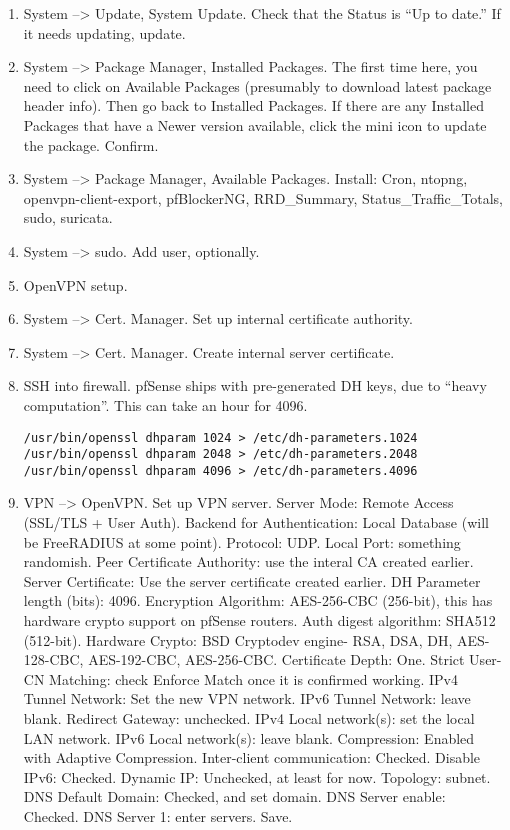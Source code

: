 \begin{enumerate}
 \item System --> Update, System Update. Check that the Status is ``Up to date.'' If it needs updating, update.
 \item System --> Package Manager, Installed Packages. The first time here, you need to click on Available Packages (presumably to download latest package header info). Then go back to Installed Packages. If there are any Installed Packages that have a Newer version available, click the mini icon to update the package. Confirm.
 \item System --> Package Manager, Available Packages. Install: Cron, ntopng, openvpn-client-export, pfBlockerNG, RRD\_Summary, Status\_Traffic\_Totals, sudo, suricata.
 \item System --> sudo. Add user, optionally.


 \item OpenVPN setup.
 \item System --> Cert. Manager. Set up internal certificate authority.
 \item System --> Cert. Manager. Create internal server certificate.
 \item SSH into firewall. pfSense ships with pre-generated DH keys, due to ``heavy computation''. This can take an hour for 4096.
\begin{verbatim}
/usr/bin/openssl dhparam 1024 > /etc/dh-parameters.1024
/usr/bin/openssl dhparam 2048 > /etc/dh-parameters.2048
/usr/bin/openssl dhparam 4096 > /etc/dh-parameters.4096
\end{verbatim}
 \item VPN --> OpenVPN. Set up VPN server. Server Mode: Remote Access (SSL/TLS + User Auth). Backend for Authentication: Local Database (will be FreeRADIUS at some point). Protocol: UDP. Local Port: something randomish. Peer Certificate Authority: use the interal CA created earlier. Server Certificate: Use the server certificate created earlier. DH Parameter length (bits): 4096. Encryption Algorithm: AES-256-CBC (256-bit), this has hardware crypto support on pfSense routers. Auth digest algorithm: SHA512 (512-bit). Hardware Crypto: BSD Cryptodev engine- RSA, DSA, DH, AES-128-CBC, AES-192-CBC, AES-256-CBC. Certificate Depth: One. Strict User-CN Matching: check Enforce Match once it is confirmed working. IPv4 Tunnel Network: Set the new VPN network. IPv6 Tunnel Network: leave blank. Redirect Gateway: unchecked.  IPv4 Local network(s): set the local LAN network. IPv6 Local network(s): leave blank. Compression: Enabled with Adaptive Compression. Inter-client communication: Checked. Disable IPv6: Checked. Dynamic IP: Unchecked, at least for now. Topology: subnet. DNS Default Domain: Checked, and set domain. DNS Server enable: Checked. DNS Server 1: enter servers. Save.

\end{enumerate}
